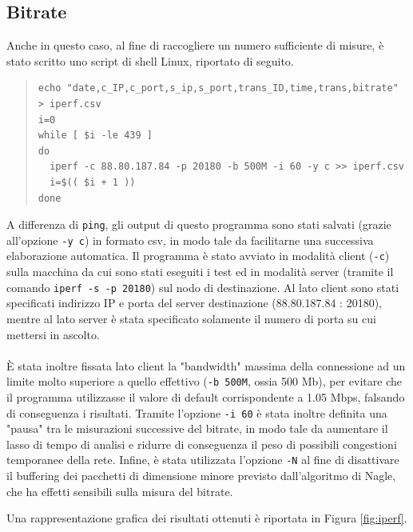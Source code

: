 \documentclass[a4paper,10pt]{article}
\begin{document}
\subsection{Bitrate}
Anche in questo caso, al fine di raccogliere un numero sufficiente di misure, è stato scritto uno script di shell Linux, riportato di seguito.
\small
\begin{quote}
\begin{verbatim}
echo "date,c_IP,c_port,s_ip,s_port,trans_ID,time,trans,bitrate" > iperf.csv
i=0
while [ $i -le 439 ]
do
  iperf -c 88.80.187.84 -p 20180 -b 500M -i 60 -y c >> iperf.csv
  i=$(( $i + 1 ))
done
\end{verbatim}
\end{quote}
\normalsize
A differenza di \texttt{ping}, gli output di questo programma sono stati salvati (grazie all'opzione \texttt{-y c}) in formato csv, in modo tale da facilitarne una successiva elaborazione automatica. Il programma è stato avviato in modalità client (\texttt{-c}) sulla macchina da cui sono stati eseguiti i test ed in modalità server (tramite il comando \texttt{iperf -s -p 20180}) sul nodo di destinazione. Al lato client sono stati specificati indirizzo IP e porta del server destinazione (88.80.187.84 : 20180), mentre al lato server è stata specificato solamente il numero di porta su cui mettersi in ascolto.\\\\
È stata inoltre fissata lato client la "bandwidth" massima della connessione ad un limite molto superiore a quello effettivo (\texttt{-b 500M}, ossia 500 Mb), per evitare che il programma utilizzasse il valore di default corrispondente a 1.05 Mbps, falsando di conseguenza i risultati. Tramite l'opzione \texttt{-i 60} è stata inoltre definita una "pausa" tra le misurazioni successive del bitrate, in modo tale da aumentare il lasso di tempo di analisi e ridurre di conseguenza il peso di possibili congestioni temporanee della rete. Infine, è stata utilizzata l'opzione \texttt{-N} al fine di disattivare il buffering dei pacchetti di dimensione minore previsto dall'algoritmo di Nagle, che ha effetti sensibili sulla misura del bitrate.
\newpage

\noindent
Una rappresentazione grafica dei risultati ottenuti è riportata in Figura \ref{fig:iperf}.
\end{document}
